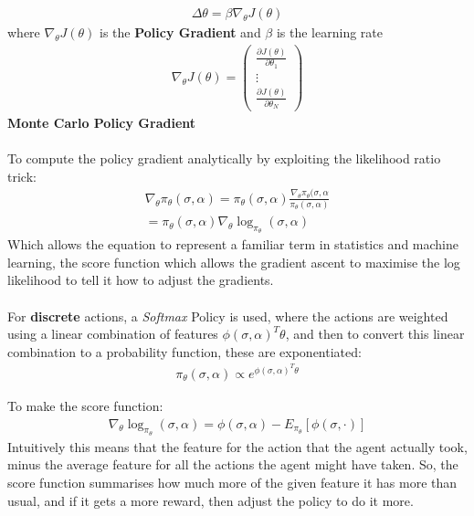\documentclass[ %
                    author={Ashwinder Khurana},
                supervisor={Prof Dave Cliff},
                    degree={MEng},
                     title={The Deeply Reinforced Trader},
                  subtitle={},
                      type={enterprise},
                      year={2020} ]{dissertation}
\def\policygradient{
\begin{pmatrix}
    \frac{\partial J(\theta)}{\partial\theta_1} \\
    \vdots \\
     \frac{\partial J(\theta)}{\partial\theta_N}
\end{pmatrix}}
\begin{document}
{\begin{equation}
\label{Policy Gradient}
\begin{split}
\Delta \theta = \beta \nabla_\theta J(\theta)
\end{split}
\end{equation}
\noindent
where $\nabla_\theta J(\theta)$ is the \textbf{Policy Gradient} and $\beta$ is the learning rate 
\begin{equation}
\label{Policy Gradient}
\begin{split}
\nabla_\theta J(\theta) = \policygradient
\end{split}
\end{equation}
\noindent
\textbf{Monte Carlo Policy Gradient}
\\
\\
To compute the policy gradient analytically by exploiting the likelihood ratio trick:
\begin{equation}
\begin{split}
\nabla_\theta \pi_\theta(\sigma, \alpha) = \pi_\theta(\sigma,\alpha) \frac{\nabla_\theta \pi_\theta(\sigma,\alpha}{\pi_\theta (\sigma, \alpha)} \\
= \pi_\theta(\sigma,\alpha) \nabla_\theta \log_{\pi_\theta} (\sigma,\alpha) 
\end{split}
\end{equation}
Which allows the equation to represent a familiar term in statistics and machine learning, the score function \cite{score-function} which allows the gradient ascent to maximise the log likelihood to tell it how to adjust the gradients.
\\
\\ 
For \textbf{discrete} actions, a \textit{Softmax} Policy is used, where the actions are weighted using a linear combination of features $\phi(\sigma,\alpha)^{T}\theta$, and then to convert this linear combination to a probability function, these are exponentiated:
\begin{equation}
\label{Policy Gradient}
\begin{split}
\pi_\theta(\sigma, \alpha) \propto e^{\phi(\sigma,\alpha)^{T}\theta}
\end{split}
\end{equation}

\noindent
To make the score function:
\begin{equation}
\label{Policy Gradient}
\begin{split}
 \nabla_\theta \log_{\pi_\theta} (\sigma,\alpha)  = \phi(\sigma,\alpha) - E_{\pi_\theta}[\phi(\sigma, \cdot)]
\end{split}
\end{equation}
Intuitively this means that the feature for the action that the agent actually took, minus the average feature for all the actions the agent might have taken. So, the score function summarises how much more of the given feature it has more than usual, and if it gets a more reward, then adjust the policy to do it more. 
\\
\\

}
\end{document}
